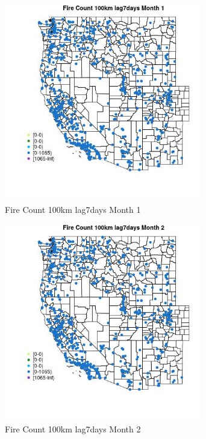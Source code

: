 \begin{figure} 
\centering  
\includegraphics[width=0.77\textwidth]{Code_Outputs/Report_ML_input_PM25_Step4_part_f_de_duplicated_aves_prioritize_24hr_obswNAs_MapObsMo1Fire_Count_100km_lag7days.jpg} 
\caption{\label{fig:Report_ML_input_PM25_Step4_part_f_de_duplicated_aves_prioritize_24hr_obswNAsMapObsMo1Fire_Count_100km_lag7days}Fire Count 100km lag7days Month 1} 
\end{figure} 
 

\begin{figure} 
\centering  
\includegraphics[width=0.77\textwidth]{Code_Outputs/Report_ML_input_PM25_Step4_part_f_de_duplicated_aves_prioritize_24hr_obswNAs_MapObsMo2Fire_Count_100km_lag7days.jpg} 
\caption{\label{fig:Report_ML_input_PM25_Step4_part_f_de_duplicated_aves_prioritize_24hr_obswNAsMapObsMo2Fire_Count_100km_lag7days}Fire Count 100km lag7days Month 2} 
\end{figure} 
 

